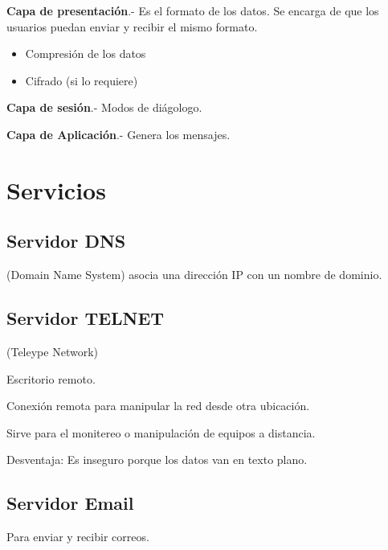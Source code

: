 \documentclass{article}
\begin{document}
\textbf{Capa de presentación}.- Es el formato de los datos. Se encarga de que los
usuarios puedan enviar y recibir el mismo formato.
\vspace{1em}

\begin{itemize}
	\item
	Compresión de los datos
	\item
	Cifrado (si lo requiere)
\end{itemize}
\vspace{1em}

\textbf{Capa de sesión}.- Modos de diágologo.
\vspace{1em}

\textbf{Capa de Aplicación}.- Genera los mensajes.
\vspace{1em}

\section{Servicios}

\subsection{Servidor DNS}

(Domain Name System) asocia una dirección IP con un  nombre de dominio.

\subsection{Servidor TELNET}

(Teleype Network)
\vspace{1em}

Escritorio remoto.
\vspace{1em}

Conexión remota para manipular la red desde otra ubicación.
\vspace{1em}

Sirve para el monitereo o manipulación de equipos a distancia.
\vspace{1em}

Desventaja: Es inseguro porque los datos van en texto plano.
\vspace{1em}

\subsection{Servidor Email}

Para enviar y recibir correos.
\vspace{1em}
\end{document}
